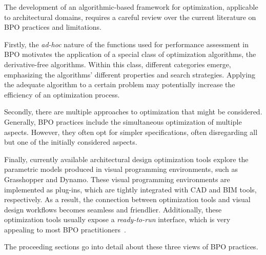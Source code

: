 \cleardoublepage
\label{chap:back}

	The development of an algorithmic-based framework for optimization, applicable to architectural domains, requires a careful review over the current literature on \ac{BPO} practices and limitations. 
	
	Firstly, the \textit{ad-hoc} nature of the functions used for performance assessment in \ac{BPO} motivates the application of a special class of optimization algorithms, the derivative-free algorithms. Within this class, different categories emerge, emphasizing the algorithms' different properties and search strategies. Applying the adequate algorithm to a certain problem may potentially increase the efficiency of an optimization process. 
	
	Secondly, there are multiple approaches to optimization that might be considered. Generally, \ac{BPO} practices include the simultaneous optimization of multiple aspects. However, they often opt for simpler specifications, often disregarding all but one of the initially considered aspects. 

	Finally, currently available architectural design optimization tools explore the parametric models produced in visual programming environments, such as Grasshopper and Dynamo. These visual programming environments are implemented as plug-ins, which are tightly integrated with \ac{CAD} and \ac{BIM} tools, respectively. As a result, the connection between optimization tools and visual design workflows becomes seamless and friendlier. Additionally, these optimization tools usually expose a \textit{ready-to-run} interface, which is very appealing to most \ac{BPO} practitioners~\cite{Cichocka2017SURVEY}.
	
	The proceeding sections go into detail about these three views of \ac{BPO} practices.
	
	

	
